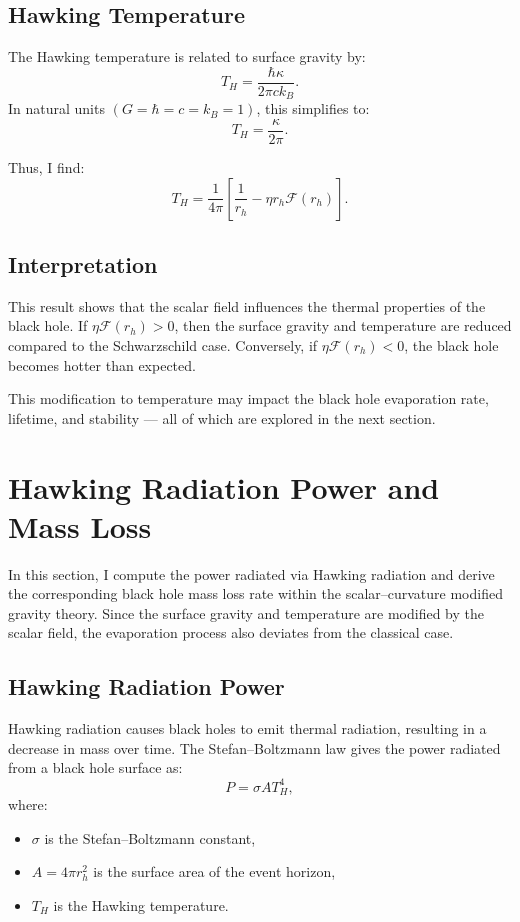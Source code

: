\documentclass[12pt]{article}
\begin{document}
\subsection{Hawking Temperature}

The Hawking temperature is related to surface gravity by:
\begin{equation}
T_H = \frac{\hbar \kappa}{2\pi c k_B}.
\end{equation}
In natural units \( (G = \hbar = c = k_B = 1) \), this simplifies to:
\begin{equation}
T_H = \frac{\kappa}{2\pi}.
\label{eq:hawking_temp}
\end{equation}

Thus, I find:
\begin{equation}
T_H = \frac{1}{4\pi} \left[ \frac{1}{r_h} - \eta r_h \mathcal{F}(r_h) \right].
\end{equation}

\subsection{Interpretation}

This result shows that the scalar field influences the thermal properties of the black hole. If \( \eta \mathcal{F}(r_h) > 0 \), then the surface gravity and temperature are reduced compared to the Schwarzschild case. Conversely, if \( \eta \mathcal{F}(r_h) < 0 \), the black hole becomes hotter than expected.

This modification to temperature may impact the black hole evaporation rate, lifetime, and stability — all of which are explored in the next section.

\section{Hawking Radiation Power and Mass Loss}

In this section, I compute the power radiated via Hawking radiation and derive the corresponding black hole mass loss rate within the scalar--curvature modified gravity theory. Since the surface gravity and temperature are modified by the scalar field, the evaporation process also deviates from the classical case.

\subsection{Hawking Radiation Power}

Hawking radiation causes black holes to emit thermal radiation, resulting in a decrease in mass over time. The Stefan--Boltzmann law gives the power radiated from a black hole surface as:
\begin{equation}
P = \sigma A T_H^4,
\end{equation}
where:
\begin{itemize}
    \item \( \sigma \) is the Stefan--Boltzmann constant,
    \item \( A = 4\pi r_h^2 \) is the surface area of the event horizon,
    \item \( T_H \) is the Hawking temperature.
\end{itemize}
\end{document}
